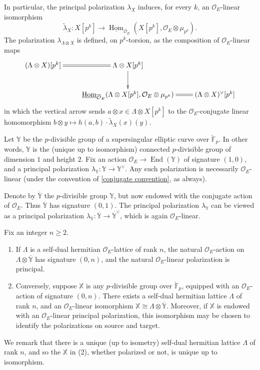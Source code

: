 \documentclass[11pt]{alggeom}
\newcommand{\iso}{\cong}
\newcommand{\F}{\mathbb F}
\newcommand{\co}{\mathcal O}
\DeclareMathOperator{\Hom}{Hom}
\DeclareMathOperator{\End}{End}
\begin{document}
In particular, the principal polarization $\lambda_X$  induces, for every $k$, an $\co_E$-linear isomorphism
\[
\tilde{\lambda}_X: X[p^k]  \to 
\underline{\Hom}_{\overline{\co}_E}(X[p^k] , \co_E \otimes  \mu_{p^k}).
\]
The polarization  $\lambda_{\Lambda \otimes X}$  is defined, on $p^k$-torsion, as the composition of $\co_E$-linear maps
\[
\xymatrix{
{    ( \Lambda \otimes X) [ p^k]   } \ar@{=} [r]&  {  \Lambda \otimes  X[p^k]   }  \ar[d]   \\  
& {   \underline{\Hom}_{\overline{\co}_E} (      \Lambda \otimes X[p^k] , \co_E \otimes \mu_{p^k} )  }  \ar@{=}[r]&   {   (\Lambda \otimes X)^\vee[p^k] } 
}
\]
in which the vertical arrow sends  $a\otimes x \in  \Lambda \otimes X[p^k]$ to the $\co_E$-conjugate linear homomorphism
$ b\otimes y \mapsto h(a,b)\cdot \tilde{\lambda}_X(x)(y).$



 Let $\mathbb{Y}$ be the $p$-divisible group of a supersingular elliptic curve over $\breve{\F}_p$.
 In other words, $\mathbb{Y}$ is the (unique up to isomorphism) connected $p$-divisible group of dimension $1$ and height $2$.
Fix an action  $\co_E \to \End(\mathbb{Y})$ of signature $(1,0)$, and a principal polarization $\lambda_{\mathbb{Y}} : \mathbb{Y} \to \mathbb{Y}^\vee$.
Any such   polarization is necessarily $\co_E$-linear (under the convention of \eqref{conjugate convention}, as always).

Denote by $\overline{\mathbb{Y}}$ the $p$-divisible group $\mathbb{Y}$, but now endowed with the conjugate action of $\co_E$.
 Thus $\overline{\mathbb{Y}}$ has signature $(0,1)$.  The principal polarization $\lambda_\mathbb{Y}$ can  be viewed as a principal polarization $\lambda_{ \overline{\mathbb{Y}}} : \overline{\mathbb{Y}} \to \overline{\mathbb{Y}} ^\vee$, which is again  $\co_E$-linear.




 
 
 
\begin{proposition}\label{prop:frame}
Fix an integer $n\ge 2$.  
\begin{enumerate}
\item
If $\Lambda$ is a self-dual hermitian $\co_E$-lattice of rank $n$,  the natural $\co_E$-action on  
$\Lambda   \otimes  \overline{\mathbb{Y}}$
 has signature $(0,n)$, and the natural   $\co_E$-linear polarization   is principal.
\item
Conversely, suppose $\mathbb{X}$ is any $p$-divisible group  over $\breve{\F}_p$,  equipped with an $\co_E$-action of signature $(0,n)$.
There exists a  self-dual hermitian lattice $\Lambda$ of rank $n$, and an $\co_E$-linear isomorphism 
$
\mathbb{X} \iso \Lambda   \otimes  \overline{\mathbb{Y}}.
$
Moreover, if $\mathbb{X}$ is endowed with   an $\co_E$-linear principal polarization, this isomorphism may be chosen to identify the polarizations on source and target.
\end{enumerate}
We remark that there is a unique (up to isometry) self-dual hermitian lattice  $\Lambda$ of rank $n$, and so the $\mathbb{X}$ in (2), whether polarized or not, is unique up to isomorphism.
\end{proposition}
\end{document}
